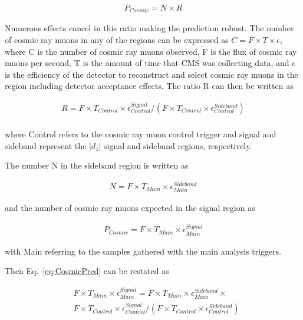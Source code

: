 \begin{equation}
\begin{split}
P_{Cosmic} = N \times R
\end{split}
\label{eq:CosmicPred}
\end{equation}

Numerous effects cancel in this ratio making the prediction robust. The number of cosmic ray muons in any of the regions can be expressed as 
$C = F \times T \times \epsilon$, where C is the number of cosmic ray muons observed, F is the flux of cosmic ray muons per second, T is the amount of time that CMS was collecting data,
and $\epsilon$ is the efficiency of the detector to reconstruct and select cosmic ray muons in the region including detector acceptance effects. 
The ratio R can then be written as

\begin{equation}
\begin{split}
R = F \times T_{Control} \times \epsilon_{Control}^{Signal} / (F \times T_{Control} \times \epsilon_{Control}^{Sideband}) \\
\end{split}
\label{eq:CosmicRatio}
\end{equation}

where Control refers to the cosmic ray muon control trigger
and signal and sideband represent the $|d_z|$ signal and sideband regions, respectively.

The number N in the sideband region is written as 

\begin{equation}
\begin{split}
N = F \times T_{Main} \times \epsilon_{Main}^{Sideband}
\end{split}
\label{eq:CosmicSide}
\end{equation}

and the number of cosmic ray muons expected in the signal region as

\begin{equation}
\begin{split}
P_{Cosmic} = F \times T_{Main} \times \epsilon_{Main}^{Signal}
\end{split}
\label{eq:CosmicSignal}
\end{equation}

with Main referring to the samples gathered with the main analysis triggers.

Then Eq.~\ref{eq:CosmicPred} can be restated as

\begin{equation}
\begin{split}
& F \times T_{Main} \times \epsilon_{Main}^{Signal} = F \times T_{Main} \times \epsilon_{Main}^{Sideband} \times \\
& F \times T_{Control} \times \epsilon_{Control}^{Signal} / (F \times T_{Control} \times \epsilon_{Control}^{Sideband}) \\
\end{split}
\label{eq:CosmicDetail}
\end{equation}

